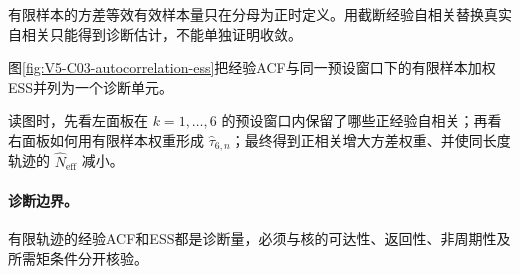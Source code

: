 \documentclass[UTF8,a4paper,11pt,openany]{ctexbook}
\begin{document}
\setcounter{page}{644}
\setcounter{chapter}{32}
\setcounter{figure}{8}
\pagestyle{headings}
有限样本的方差等效有效样本量只在分母为正时定义。用截断经验自相关替换真实自相关只能得到诊断估计，不能单独证明收敛。

图\ref{fig:V5-C03-autocorrelation-ess}把经验ACF与同一预设窗口下的有限样本加权ESS并列为一个诊断单元。

\FloatBarrier
读图时，先看左面板在 $k=1,\ldots,6$ 的预设窗口内保留了哪些正经验自相关；再看右面板如何用有限样本权重形成 $\widehat\tau_{6,n}$；最终得到正相关增大方差权重、并使同长度轨迹的 $\widehat N_{\mathrm{eff}}$ 减小。

\paragraph{诊断边界。}有限轨迹的经验ACF和ESS都是诊断量，必须与核的可达性、返回性、非周期性及所需矩条件分开核验。
\end{document}
